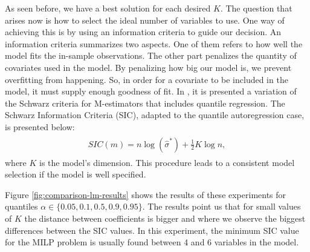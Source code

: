



As seen before, we have a best solution for each desired $K$. The question that arises now is how to select the ideal number of variables to use.
One way of achieving this is by using an information criteria to guide our decision. 
An information criteria summarizes two aspects. One of them refers to how well the model fits the in-sample observations. The other part penalizes the quantity of covariates used in the model. By penalizing how big our model is, we prevent overfitting from happening. So, in order for a covariate to be included in the model, it must supply enough goodness of fit.
In \cite{machado1993robust}, it is presented a variation of the Schwarz criteria for M-estimators that includes quantile regression. The Schwarz Information Criteria (SIC), adapted to the quantile autoregression case, is presented below:
\begin{align} 
\begin{split}
SIC(m) = n \log(\hat{\sigma}^*)+\frac{1}{2}K\log n,\label{eq:SIC}
\end{split}					
\end{align}
where $K$ is the model's dimension. This procedure leads to a consistent model selection if the model is well specified. 

Figure \ref{fig:comparison-lm-results} shows the results of these experiments for quantiles $\alpha \in \{0.05, 0.1, 0.5, 0.9, 0.95\}$. The results point us that for small values of $K$ the distance between coefficients is bigger and where we observe the biggest differences between the SIC values. In this experiment, the minimum SIC value for the MILP problem is usually found between 4 and 6 variables in the model.

